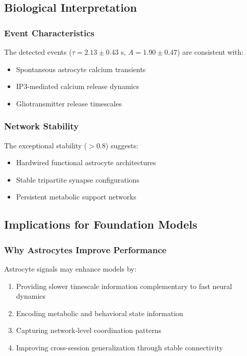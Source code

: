 \documentclass[11pt,twocolumn]{article}
\begin{document}
\subsection{Biological Interpretation}

\subsubsection{Event Characteristics}
The detected events ($\tau = 2.13 \pm 0.43$ s, $A = 1.90 \pm 0.47$) are consistent with:
\begin{itemize}
    \item Spontaneous astrocyte calcium transients \citep{wang2006astrocytic}
    \item IP3-mediated calcium release dynamics
    \item Gliotransmitter release timescales
\end{itemize}

\subsubsection{Network Stability}
The exceptional stability ($> 0.8$) suggests:
\begin{itemize}
    \item Hardwired functional astrocyte architectures
    \item Stable tripartite synapse configurations
    \item Persistent metabolic support networks
\end{itemize}

\subsection{Implications for Foundation Models}

\subsubsection{Why Astrocytes Improve Performance}
Astrocyte signals may enhance models by:
\begin{enumerate}
    \item Providing slower timescale information complementary to fast neural dynamics
    \item Encoding metabolic and behavioral state information
    \item Capturing network-level coordination patterns
    \item Improving cross-session generalization through stable connectivity
\end{enumerate}
\end{document}
